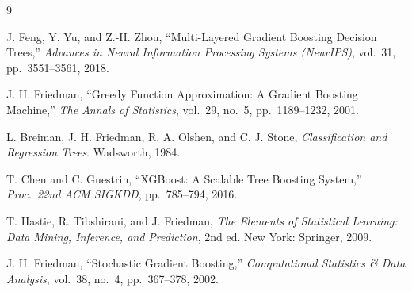 \documentclass[11pt,a4paper]{article}
\begin{document}
\renewcommand{\refname}{references}
\begin{thebibliography}{9}

J. Feng, Y. Yu, and Z.-H. Zhou,
``Multi-Layered Gradient Boosting Decision Trees,''
\textit{Advances in Neural Information Processing Systems (NeurIPS)},
vol.~31, pp.~3551--3561, 2018.

J. H. Friedman,
``Greedy Function Approximation: A Gradient Boosting Machine,''
\textit{The Annals of Statistics}, vol.~29, no.~5, pp.~1189--1232, 2001.

L. Breiman, J. H. Friedman, R. A. Olshen, and C. J. Stone,
\textit{Classification and Regression Trees}.
Wadsworth, 1984.

T. Chen and C. Guestrin,
``XGBoost: A Scalable Tree Boosting System,''
\textit{Proc.\ 22nd ACM SIGKDD}, pp.~785--794, 2016.

T. Hastie, R. Tibshirani, and J. Friedman,
\textit{The Elements of Statistical Learning: Data Mining, Inference, and
Prediction}, 2nd ed.
New York: Springer, 2009.

J. H. Friedman,
``Stochastic Gradient Boosting,''
\textit{Computational Statistics \& Data Analysis}, vol.~38, no.~4,
pp.~367--378, 2002.

\end{thebibliography}
\end{document}
